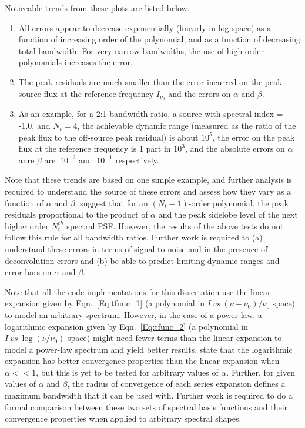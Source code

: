 \documentclass[structabstract]{stylefiles/aa}
\begin{document}
\noindent Noticeable trends from these plots are listed below.
\begin{enumerate}
\item All errors appear to decrease exponentially (linearly in log-space)
as a function of increasing order of the polynomial, and as a function
of decreasing total bandwidth. For very narrow bandwidths, the use of
high-order polynomials increases the error.
\item The peak residuals are much smaller than the error incurred on the 
peak source flux at the reference frequency $I_{\nu_0}$ and the
errors on $\alpha$ and $\beta$. 
\item As an example, for a 2:1 bandwidth ratio, 
a source with spectral index = -1.0, and $N_t=4$,
the achievable dynamic range (measured as the ratio of the peak flux to the 
off-source peak residual) is about $10^5$, the error on the peak flux
at the reference frequency is 1 part in $10^3$, and the absolute
errors on $\alpha$ anre $\beta$ are $~10^{-2}$ and $~10^{-1}$ respectively.
\end{enumerate}
\noindent Note that these trends are based on one simple example, 
and further
analysis is required to understand the source of these errors and
assess how they vary as a function 
of $\alpha$ and $\beta$.
\citet{MFCLEAN_CCW} suggest that for an $(N_t-1)$-order
polynomial, the peak residuals proportional to the product of
$\alpha$ and the peak sidelobe level of the next higher order
$N_t^{th}$ spectral PSF. However, the results of the above tests 
do not follow this rule for all bandwidth ratios.  
Further work is required to (a) understand these errors in terms of
signal-to-noise and in the presence of deconvolution errors and
(b) be able to predict limiting dynamic ranges and error-bars on
$\alpha$ and $\beta$.

Note that all the code implementations for this dissertation use the 
linear expansion given by Eqn.~\ref{Eq:tfunc_1} 
(a polynomial in $I ~ vs ~ (\nu-\nu_0)/\nu_0$ space) to model an 
arbitrary spectrum.
However, in the case of a power-law, a logarithmic expansion
given by Eqn.~\ref{Eq:tfunc_2} 
(a polynomial in $I ~ vs ~ \log(\nu/\nu_0)$ space)
might need fewer terms than the linear expansion to model a power-law spectrum
and yield better results.
\citet{MFCLEAN_CCW} state that the logarithmic expansion has better convergence
properties than the linear expansion when $\alpha << 1$, but
this is yet to be tested for arbitrary values of $\alpha$.
Further, for given values of $\alpha$ and $\beta$, the radius of 
convergence of each series expansion defines a maximum bandwidth 
that it can be used with.
Further work is required to
do a formal comparison between these two sets of spectral basis functions
and their convergence properties when applied to arbitrary spectral shapes.
\end{document}
